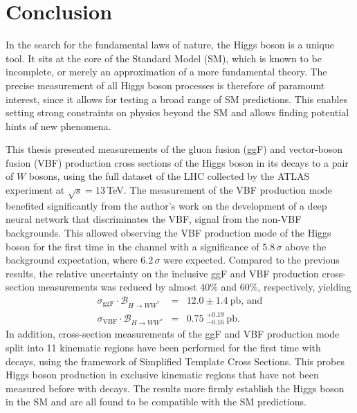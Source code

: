 \chapter{Conclusion}
\label{chap:conclusion}
In the search for the fundamental laws of nature, the Higgs boson is a unique tool. 
It sits at the core of the Standard Model (SM), which is known to be incomplete, or merely an approximation of a more fundamental theory. 
The precise measurement of all Higgs boson processes is therefore of paramount interest, since it allows for testing a broad range of SM predictions. This enables setting strong constraints on physics beyond the SM and allows finding potential hints of new phenomena.

This thesis presented measurements of the gluon fusion (ggF) and vector-boson fusion (VBF) production cross sections of the Higgs boson in its decays to a pair of $W$ bosons, using the full \RunTwo dataset of the LHC collected by the ATLAS experiment at $\sqrt{s} = 13\,$TeV. 
The measurement of the VBF production mode benefited significantly from the author's work on the development of a deep neural network that discriminates the VBF, \HWW signal from the non-VBF backgrounds. 
This allowed observing the VBF production mode of the Higgs boson for the first time in the \HWW channel with a significance of $5.8\,\sigma$ above the background expectation, where $6.2\,\sigma$ were expected.
Compared to the previous \RunTwo results, the relative uncertainty on the inclusive ggF and VBF production cross-section measurements was reduced by almost 40\% and 60\%, respectively, yielding 
\begin{eqnarray*}
    \sigma_{\mathrm{ggF}} \cdot \mathcal{B}_{H \to WW^{\ast}} &=& 12.0 \pm 1.4~\mathrm{pb}, \,\text{and} \\
    \sigma_{\mathrm{VBF}} \cdot \mathcal{B}_{H \to WW^{\ast}} &=& 0.75\;^{+0.19}_{-0.16}~\mathrm{pb}.
\end{eqnarray*}
In addition, cross-section measurements of the ggF and VBF production mode split into 11 kinematic regions have been performed for the first time with \HWW decays, using the framework of Simplified Template Cross Sections. This probes Higgs boson production in exclusive kinematic regions that have not been measured before with \HWW decays.
The results more firmly establish the Higgs boson in the SM and are all found to be compatible with the SM predictions.


